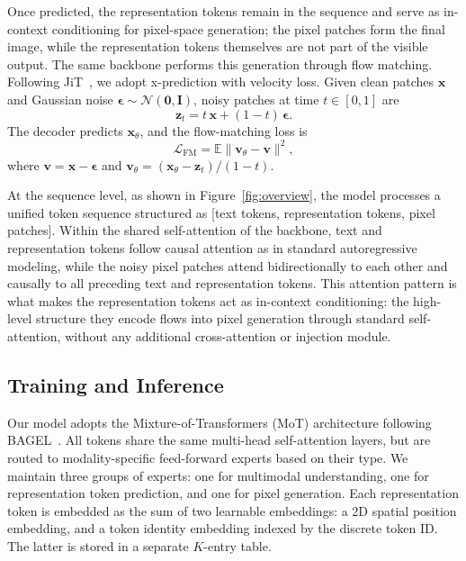 Once predicted, the representation tokens remain in the sequence and serve as in-context conditioning for pixel-space generation; the pixel patches form the final image, while the representation tokens themselves are not part of the visible output. The same backbone performs this generation through flow matching. Following JiT~\cite{jit}, we adopt x-prediction with velocity loss. Given clean patches $\mathbf{x}$ and Gaussian noise $\boldsymbol{\epsilon} \sim \mathcal{N}(\mathbf{0}, \mathbf{I})$, noisy patches at time $t \in [0, 1]$ are
\begin{equation}
    \mathbf{z}_t = t\,\mathbf{x} + (1 - t)\,\boldsymbol{\epsilon}.
\end{equation}
The decoder predicts $\mathbf{x}_\theta$, and the flow-matching loss is
\begin{equation}
    \mathcal{L}_{\text{FM}} = \mathbb{E} \big\| \mathbf{v}_\theta - \mathbf{v} \big\|^2,
\end{equation}
where $\mathbf{v} = \mathbf{x} - \boldsymbol{\epsilon}$ and $\mathbf{v}_\theta = (\mathbf{x}_\theta - \mathbf{z}_t)/(1 - t)$.



At the sequence level, as shown in Figure~\ref{fig:overview}, the model processes a unified token sequence structured as [text tokens, representation tokens, pixel patches]. Within the shared self-attention of the backbone, text and representation tokens follow causal attention as in standard autoregressive modeling, while the noisy pixel patches attend bidirectionally to each other and causally to all preceding text and representation tokens. This attention pattern is what makes the representation tokens act as in-context conditioning: the high-level structure they encode flows into pixel generation through standard self-attention, without any additional cross-attention or injection module.


\subsection{Training and Inference}
\label{sec:3.3}
Our model adopts the Mixture-of-Transformers (MoT) architecture following BAGEL~\cite{bagel}. All tokens share the same multi-head self-attention layers, but are routed to modality-specific feed-forward experts based on their type. We maintain three groups of experts: one for multimodal understanding, one for representation token prediction, and one for pixel generation. Each representation token is embedded as the sum of two learnable embeddings: a 2D spatial position embedding, and a token identity embedding indexed by the discrete token ID. The latter is stored in a separate $K$-entry table.


